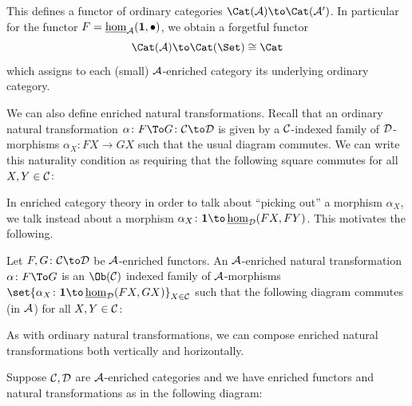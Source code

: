     This defines a functor of ordinary categories $\Cat(\A)\to\Cat(\A')$.
    In particular for the functor $F=\mathop{\underline{\hom}}\nolimits_{{\cal A}}({\bf1},\bullet)$, we obtain a forgetful functor
    $$ \Cat(\A) \to \Cat(\Set) \cong \Cat $$
    which assigns to each (small) ${{\cal A}}$-enriched category its underlying ordinary category.

\eexam

We can also define enriched natural transformations.
Recall that an ordinary natural transformation $\alpha\colon F\To G\colon\C\to\D$ is given by a ${{\cal C}}$-indexed family of ${{\cal D}}$-morphisms
$\alpha_X\colon FX\to GX$ such that the usual diagram commutes.
We can write this naturality condition as requiring that the following square commutes for all $X,Y\in{{\cal C}}$:


In enriched category theory in order to talk about ``picking out'' a morphism $\alpha_X$, we talk instead about a morphism
$\alpha_X\colon\1\to\ehom_\D(FX,FY)$.
This motivates the following.

\bdefn[title={Enriched natural transformations}]

    Let $F,G\colon\C\to\D$ be ${{\cal A}}$-enriched functors.
    An {\emphcolor ${{\cal A}}$-enriched natural transformation} $\alpha\colon F\To G$ is an $\Ob(\C)$ indexed family of ${{\cal A}}$-morphisms
    $\set{\alpha_X\colon\1\to\ehom_\D(FX,GX)}_{X\in\C}$ such that the following diagram commutes (in ${{\cal A}}$) for all $X,Y\in{{\cal C}}$:


\edefn

As with ordinary natural transformations, we can compose enriched natural transformations both vertically and horizontally.

\bdefn

    Suppose ${{\cal C}},{{\cal D}}$ are ${{\cal A}}$-enriched categories and we have enriched functors and natural transformations as in the following diagram:

